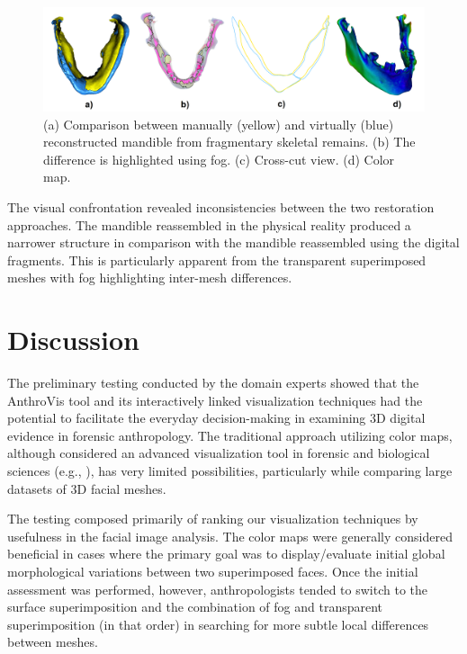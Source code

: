 \documentclass[final,5p,times]{elsarticle}
\begin{document}
\begin{figure}[htb]
	\centering
  \includegraphics[width=0.9\linewidth]{pictures/case3.png}
  \caption{\label{fig:case3} (a) Comparison between manually (yellow) and virtually (blue) reconstructed mandible from fragmentary skeletal remains. (b) The difference is highlighted using fog. (c) Cross-cut view. (d) Color map.}
\end{figure}

The visual confrontation revealed inconsistencies between the two restoration approaches. 
The mandible reassembled in the physical reality produced a narrower structure in comparison with the mandible reassembled using the digital fragments. 
This is particularly apparent from the transparent superimposed meshes with fog highlighting inter-mesh differences. 
 
\section{Discussion} \label{discussion}
The preliminary testing conducted by the domain experts showed that the AnthroVis tool and its interactively linked visualization techniques had the potential to facilitate the everyday decision-making in examining 3D digital evidence in forensic anthropology.
The traditional approach utilizing color maps, although considered an advanced visualization tool in forensic and biological sciences (e.g., \cite{urbanova2015testing}), has very limited possibilities, particularly while comparing large datasets of 3D facial meshes.

The testing composed primarily of ranking our visualization techniques by usefulness in the facial image analysis. 
The color maps were generally considered beneficial in cases where the primary goal was to display/evaluate initial global morphological variations between two superimposed faces. 
Once the initial assessment was performed, however, anthropologists tended to switch to the surface superimposition and the combination of fog and transparent superimposition (in that order) in searching for more subtle local differences between meshes. 
\end{document}

